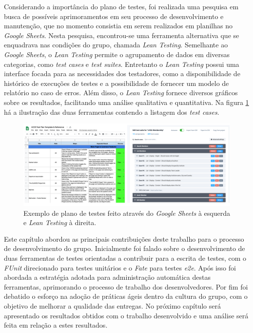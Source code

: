 Considerando a importância do plano de testes, foi realizada uma pesquisa em busca de possíveis aprimoramentos em seu processo de desenvolvimento e manutenção, que no momento consistia em serem realizados em planilhas no \emph{Google Sheets}. Nesta pesquisa, encontrou-se uma ferramenta alternativa que se enquadrava nas condições do grupo, chamada \emph{Lean Testing}. Semelhante ao \emph{Google Sheets}, o \emph{Lean Testing} permite o agrupamento de dados em diversas categorias, como \emph{test cases} e \emph{test suites}. Entretanto o \emph{Lean Testing} possui uma interface focada para as necessidades dos testadores, como a disponibilidade de histórico de execuções de testes e a possibilidade de fornecer um modelo de relatório no caso de erros. Além disso, o \emph{Lean Testing} fornece diversos gráficos sobre os resultados, facilitando uma análise qualitativa e quantitativa. Na figura \ref{fig:plano-testesfig:teste-unitario} há a ilustração das duas ferramentas contendo a listagem dos \emph{test cases}.

\begin{figure}[H]
    \centering
    \includegraphics[width=15cm]{source/4-solucao/images/plano-testes.png}
    \caption{Exemplo de plano de testes feito através do \emph{Google Sheets} à esquerda e \emph{Lean Testing} à direita.}
    \label{fig:plano-testesfig:teste-unitario}
\end{figure}

Este capítulo abordou as principais contribuições deste trabalho para o processo de desenvolvimento do grupo. Inicialmente foi falado sobre o desenvolvimento de duas ferramentas de testes orientadas a contribuir para a escrita de testes, com o \emph{FUnit} direcionado para testes unitários e o \emph{Fate} para testes \emph{e2e}. Após isso foi abordada a estratégia adotada para administração automática destas ferramentas, aprimorando o processo de trabalho dos desenvolvedores. Por fim foi debatido o esforço na adoção de práticas ágeis dentro da cultura do grupo, com o objetivo de melhorar a qualidade das entregas. No próximo capítulo será apresentado os resultados obtidos com o trabalho desenvolvido e uma análise será feita em relação a estes resultados.